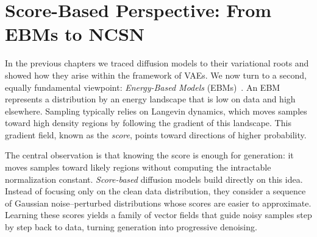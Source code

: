 \chapter{Score-Based Perspective: From EBMs to NCSN}\label{ch:score-based}


In the previous chapters we traced diffusion models to their variational roots and showed how they arise within the framework of VAEs. We now turn to a second, equally fundamental viewpoint: \emph{Energy-Based Models} (EBMs)~\citep{ackley1985learning,lecun2006tutorial}. An EBM represents a distribution by an energy landscape that is low on data and high elsewhere. Sampling typically relies on Langevin dynamics, which moves samples toward high density regions by following the gradient of this landscape. This gradient field, known as the \emph{score}, points toward directions of higher probability.

The central observation is that knowing the score is enough for generation: it moves samples toward likely regions without computing the intractable normalization constant. \emph{Score-based} diffusion models build directly on this idea. Instead of focusing only on the clean data distribution, they consider a sequence of Gaussian noise–perturbed distributions whose scores are easier to approximate. Learning these scores yields a family of vector fields that guide noisy samples step by step back to data, turning generation into progressive denoising.



